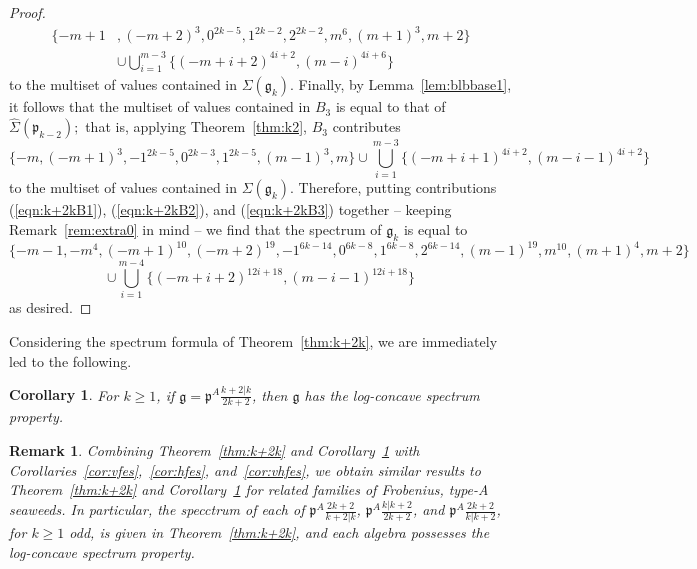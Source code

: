 \documentclass[letterpaper,10pt]{article}
\newtheorem{corollary}[theorem]{Corollary}
\newtheorem{remark}[theorem]{Remark}
\begin{document}
\begin{proof}
\begin{equation}\label{eqn:k+2kB2}
\begin{aligned}
\{-m+1&,(-m+2)^3,0^{2k-5},1^{2k-2},2^{2k-2},m^6,(m+1)^3,m+2\}\\
&\cup\bigcup_{i=1}^{m-3}\{(-m+i+2)^{4i+2},(m-i)^{4i+6}\}
\end{aligned}
\end{equation}
to the multiset of values contained in $\Sigma(\mathfrak{g}_k).$ Finally, by Lemma~\ref{lem:blbbase1}, it follows that the multiset of values contained in $B_3$ is equal to that of $\widehat{\Sigma}(\mathfrak{p}_{k-2});$ that is, applying Theorem~\ref{thm:k2}, $B_3$ contributes
\begin{equation}\label{eqn:k+2kB3}
\{-m,(-m+1)^3,-1^{2k-5},0^{2k-3},1^{2k-5},(m-1)^3,m\}
\cup\bigcup_{i=1}^{m-3}\{(-m+i+1)^{4i+2},(m-i-1)^{4i+2}\}
\end{equation}
to the multiset of values contained in $\Sigma(\mathfrak{g}_k).$ Therefore, putting contributions (\ref{eqn:k+2kB1}), (\ref{eqn:k+2kB2}), and (\ref{eqn:k+2kB3}) together -- keeping Remark~\ref{rem:extra0} in mind -- we find that the spectrum of $\mathfrak{g}_k$ is equal to
$$\{-m-1,-m^4,(-m+1)^{10},(-m+2)^{19},-1^{6k-14},0^{6k-8},1^{6k-8},2^{6k-14},(m-1)^{19},m^{10},(m+1)^4,m+2\}$$
$$\cup\bigcup_{i=1}^{m-4}\{(-m+i+2)^{12i+18},(m-i-1)^{12i+18}\}$$ as desired.
\end{proof}

Considering the spectrum formula of Theorem~\ref{thm:k+2k}, we are immediately led to the following.

\begin{corollary}\label{cor:logk2k}
For $k\ge 1$, if $\mathfrak{g}=\mathfrak{p}^A\frac{k+2|k}{2k+2}$, then $\mathfrak{g}$ has the log-concave spectrum property.
\end{corollary}

\begin{remark}
    Combining Theorem~\ref{thm:k+2k} and Corollary~\ref{cor:logk2k} with Corollaries~\ref{cor:vfes},~\ref{cor:hfes}, and~\ref{cor:vhfes}, we obtain similar results to Theorem~\ref{thm:k+2k} and Corollary~\ref{cor:logk2k} for related families of Frobenius, type-A seaweeds. In particular, the specctrum of each of $\mathfrak{p}^A\frac{2k+2}{k+2|k}$, $\mathfrak{p}^A\frac{k|k+2}{2k+2}$, and $\mathfrak{p}^A\frac{2k+2}{k|k+2}$, for $k\ge 1$ odd, is given in Theorem~\ref{thm:k+2k}, and each algebra possesses the log-concave spectrum property.
\end{remark}
\end{document}
